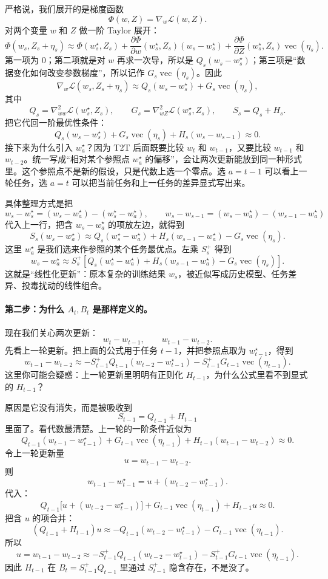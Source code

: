 \documentclass[UTF8,fontset=none,11pt]{ctexart}
\theoremstyle{cnstyle}
\newcommand{\vect}{\operatorname{vec}}
\newcommand{\calL}{\mathcal{L}}
\begin{document}
严格说，我们展开的是梯度函数
\[
  \Phi(w,Z)=\nabla_w\calL(w,Z).
\]
对两个变量 \(w\) 和 \(Z\) 做一阶 Taylor 展开：
\[
  \Phi(w_s,Z_s+\eta_s)
  \approx
  \Phi(w_s^\star,Z_s)
  +
  \frac{\partial \Phi}{\partial w}(w_s^\star,Z_s)(w_s-w_s^\star)
  +
  \frac{\partial \Phi}{\partial Z}(w_s^\star,Z_s)\vect(\eta_s).
\]
第一项为 0；第二项就是对 \(w\) 再求一次导，所以是 \(Q_s(w_s-w_s^\star)\)；第三项是“数据变化如何改变参数梯度”，所以记作 \(G_s\vect(\eta_s)\)。因此
\[
  \nabla_w\calL(w_s,Z_s+\eta_s)
  \approx
  Q_s(w_s-w_s^\star)+G_s\vect(\eta_s),
\]
其中
\[
  Q_s=\nabla_{ww}^2\calL(w_s^\star,Z_s),
  \qquad
  G_s=\nabla_{wZ}^2\calL(w_s^\star,Z_s),
  \qquad
  S_s=Q_s+H_s.
\]
把它代回一阶最优性条件：
\[
  Q_s(w_s-w_s^\star)+G_s\vect(\eta_s)+H_s(w_s-w_{s-1})\approx0.
\]
接下来为什么引入 \(w_a^\star\)？因为 T2T 后面既要比较 \(w_t\) 和 \(w_{t-1}\)，又要比较 \(w_{t-1}\) 和 \(w_{t-2}\)。统一写成“相对某个参照点 \(w_a^\star\) 的偏移”，会让两次更新能放到同一种形式里。这个参照点不是新的假设，只是代数上选一个零点。选 \(a=t-1\) 可以看上一轮任务，选 \(a=t\) 可以把当前任务和上一任务的差异显式写出来。

具体整理方式是把
\[
  w_s-w_s^\star=(w_s-w_a^\star)-(w_s^\star-w_a^\star),
  \qquad
  w_s-w_{s-1}=(w_s-w_a^\star)-(w_{s-1}-w_a^\star)
\]
代入上一行，把含 \(w_s-w_a^\star\) 的项放左边，就得到
\[
  S_s(w_s-w_a^\star)
  \approx
  Q_s(w_s^\star-w_a^\star)
  +H_s(w_{s-1}-w_a^\star)
  -G_s\vect(\eta_s).
\]
这里 \(w_a^\star\) 是我们选来作参照的某个任务最优点。左乘 \(S_s^+\) 得到
\[
  w_s-w_a^\star
  \approx
  S_s^+
  \left[
  Q_s(w_s^\star-w_a^\star)
  +H_s(w_{s-1}-w_a^\star)
  -G_s\vect(\eta_s)
  \right].
\]
这就是“线性化更新”：原本复杂的训练结果 \(w_s\)，被近似写成历史模型、任务差异、投毒扰动的线性组合。

\paragraph{第二步：为什么 \(A_t,B_t\) 是那样定义的。}
现在我们关心两次更新：
\[
  w_t-w_{t-1},
  \qquad
  w_{t-1}-w_{t-2}.
\]
先看上一轮更新。把上面的公式用于任务 \(t-1\)，并把参照点取为 \(w_{t-1}^\star\)，得到
\[
  w_{t-1}-w_{t-2}
  \approx
  -S_{t-1}^+Q_{t-1}(w_{t-2}-w_{t-1}^\star)
  -S_{t-1}^+G_{t-1}\vect(\eta_{t-1}).
\]
这里你可能会疑惑：上一轮更新里明明有正则化 \(H_{t-1}\)，为什么公式里看不到显式的 \(H_{t-1}\)？

原因是它没有消失，而是被吸收到
\[
  S_{t-1}=Q_{t-1}+H_{t-1}
\]
里面了。看代数最清楚。上一轮的一阶条件近似为
\[
  Q_{t-1}(w_{t-1}-w_{t-1}^\star)
  +G_{t-1}\vect(\eta_{t-1})
  +H_{t-1}(w_{t-1}-w_{t-2})
  \approx0.
\]
令上一轮更新量
\[
  u=w_{t-1}-w_{t-2}.
\]
则
\[
  w_{t-1}-w_{t-1}^\star
  =
  u+(w_{t-2}-w_{t-1}^\star).
\]
代入：
\[
  Q_{t-1}\bigl[u+(w_{t-2}-w_{t-1}^\star)\bigr]
  +G_{t-1}\vect(\eta_{t-1})
  +H_{t-1}u
  \approx0.
\]
把含 \(u\) 的项合并：
\[
  (Q_{t-1}+H_{t-1})u
  \approx
  -Q_{t-1}(w_{t-2}-w_{t-1}^\star)
  -G_{t-1}\vect(\eta_{t-1}).
\]
所以
\[
  u
  =
  w_{t-1}-w_{t-2}
  \approx
  -S_{t-1}^+Q_{t-1}(w_{t-2}-w_{t-1}^\star)
  -S_{t-1}^+G_{t-1}\vect(\eta_{t-1}).
\]
因此 \(H_{t-1}\) 在 \(B_t=S_{t-1}^+Q_{t-1}\) 里通过 \(S_{t-1}^+\) 隐含存在，不是没了。
\end{document}
